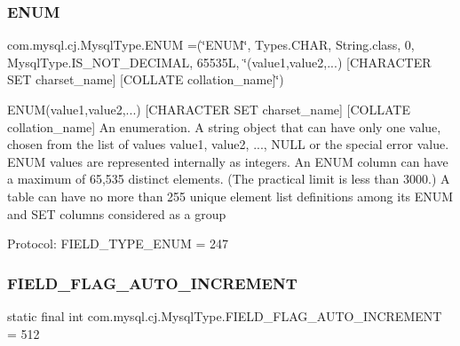 \subsubsection{\texorpdfstring{E\+N\+UM}{ENUM}}
{\footnotesize\ttfamily com.\+mysql.\+cj.\+Mysql\+Type.\+E\+N\+UM =(\char`\"{}E\+N\+UM\char`\"{}, Types.\+C\+H\+AR, String.\+class, 0, Mysql\+Type.\+I\+S\+\_\+\+N\+O\+T\+\_\+\+D\+E\+C\+I\+M\+AL, 65535\+L, \char`\"{}(\textquotesingle{}value1\textquotesingle{},\textquotesingle{}value2\textquotesingle{},...) \mbox{[}\+C\+H\+A\+R\+A\+C\+T\+E\+R S\+E\+T charset\+\_\+name\mbox{]} \mbox{[}\+C\+O\+L\+L\+A\+T\+E collation\+\_\+name\mbox{]}\char`\"{})}

E\+N\+UM(\textquotesingle{}value1\textquotesingle{},\textquotesingle{}value2\textquotesingle{},...) \mbox{[}C\+H\+A\+R\+A\+C\+T\+ER S\+ET charset\+\_\+name\mbox{]} \mbox{[}C\+O\+L\+L\+A\+TE collation\+\_\+name\mbox{]} An enumeration. A string object that can have only one value, chosen from the list of values \textquotesingle{}value1\textquotesingle{}, \textquotesingle{}value2\textquotesingle{}, ..., N\+U\+LL or the special \textquotesingle{}\textquotesingle{} error value. E\+N\+UM values are represented internally as integers. An E\+N\+UM column can have a maximum of 65,535 distinct elements. (The practical limit is less than 3000.) A table can have no more than 255 unique element list definitions among its E\+N\+UM and S\+ET columns considered as a group

Protocol\+: F\+I\+E\+L\+D\+\_\+\+T\+Y\+P\+E\+\_\+\+E\+N\+UM = 247 \mbox{\label{enumcom_1_1mysql_1_1cj_1_1_mysql_type_a463794129f72400e3cbbffc8072485fe}} 
\subsubsection{\texorpdfstring{F\+I\+E\+L\+D\+\_\+\+F\+L\+A\+G\+\_\+\+A\+U\+T\+O\+\_\+\+I\+N\+C\+R\+E\+M\+E\+NT}{FIELD\_FLAG\_AUTO\_INCREMENT}}
{\footnotesize\ttfamily  static  final int com.\+mysql.\+cj.\+Mysql\+Type.\+F\+I\+E\+L\+D\+\_\+\+F\+L\+A\+G\+\_\+\+A\+U\+T\+O\+\_\+\+I\+N\+C\+R\+E\+M\+E\+NT = 512\hspace{0.3cm}{\ttfamily [static]}}

